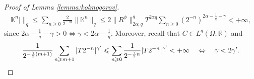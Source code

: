 \documentclass[11pt,a4paper]{article}
\newcommand{\R}{\mathbb{R}}
\theoremstyle{plain}
\begin{document}
\begin{appendices}
\begin{proof}[Proof of Lemma \ref{lemma:kolmogorov}]
\begin{eqnarray*}
  \mathbb{K}^n | \Big\|_q  \leq \sum_{n \geqslant 0} \frac{2}{2^{-
  \gamma n}} \| \mathbb{K}^n \|_q 
   \leq  2 \| R^{\phi} \|_{2 \alpha ; q}^q T^{2 \alpha q}  \sum_{n
  \geqslant 0} (2^{- n})^{2 \alpha - \frac{1}{q} - \gamma} < + \infty,
\end{eqnarray*}
since $2 \alpha - \frac{1}{q} - \gamma > 0 \Leftrightarrow \gamma < 2 \alpha -
\frac{1}{q}$.
Moreover, recall that $C \in L^q(\Omega;\R)$ and
\begin{equation*}
  \frac{1}{2^{- \frac{\gamma}{2} (m + 1)}} \sum_{n \geqslant m + 1} | T 2^{- n}
  |^{\gamma'}  \leqslant  \sum_{n \geqslant 0} \frac{1}{2^{- \frac{\gamma}{2}
  n}}  | T 2^{- n} |^{\gamma'} < + \infty \quad \Leftrightarrow \quad  \gamma < 2
  \gamma' . \qedhere
\end{equation*}
\end{proof}

\end{appendices}
\end{document}
